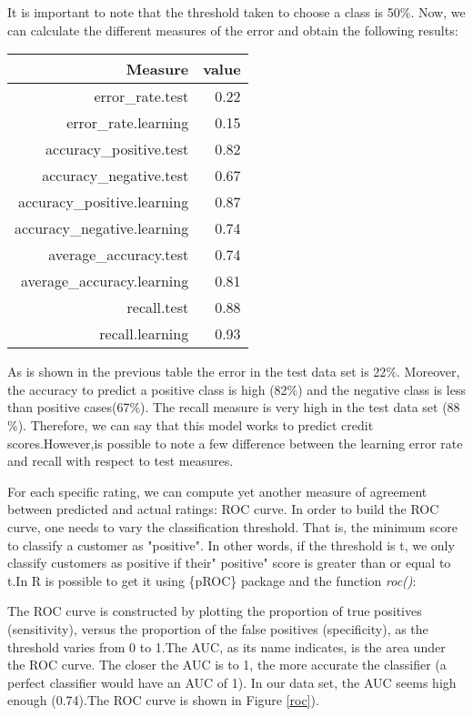 \documentclass[a4paper, 10pt]{article}
\begin{document}


It is important to note that the threshold taken to choose a class is 50$\%$. Now, we can calculate the different measures of the error and obtain the following results:

\begin{table}[ht]
	\centering
	\begin{tabular}{rr}
		\hline
		Measure & value  \\ 
		\hline
		error\_rate.test & 0.22 \\ 
		error\_rate.learning & 0.15 \\  
		accuracy\_positive.test & 0.82 \\ 
		accuracy\_negative.test & 0.67 \\ 
		accuracy\_positive.learning & 0.87 \\ 
		accuracy\_negative.learning & 0.74 \\
		average\_accuracy.test & 0.74 \\ 
		average\_accuracy.learning & 0.81 \\ 
		recall.test & 0.88 \\ 
		recall.learning & 0.93 \\ 
		\hline
	\end{tabular}
\end{table}

As is shown in the previous table the error in the test data set is 22$\%$. Moreover, the accuracy to predict a positive class is high (82$\%$) and the negative class is less than positive cases(67$\%$). The recall measure is very high in the test data set (88$\%$). Therefore, we can say that this model works to predict credit scores.However,is possible to note a few difference between the learning error rate and recall with respect to test measures. 


For each specific rating, we can compute yet another measure of agreement between predicted and actual ratings: ROC curve. In order to build the ROC curve, one needs to vary the classification threshold. That is, the minimum score to classify a customer as "positive". In other words, if the threshold is t, we only classify customers as positive if their" positive" score is greater than or equal to t.In R is possible to get it using \{pROC\} package and the function \textit{roc()}:



The ROC curve is constructed by plotting the proportion of true positives (sensitivity), versus the proportion of the false positives (specificity), as the threshold varies from 0 to 1.The AUC, as its name indicates, is the area under the ROC curve. The closer the AUC is to 1, the more accurate the classifier (a perfect classifier would have an AUC of 1). In our data set, the AUC seems high enough (0.74).The ROC curve is shown in Figure \ref{roc}).
 
\end{document}
